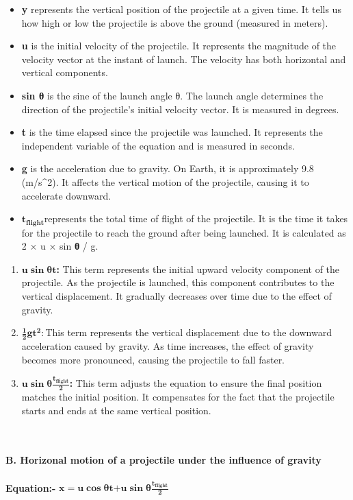 \documentclass{article}
\begin{document}
\begin{itemize}
\item
  \textbf{y} represents the vertical position of the projectile at a
  given time. It tells us how high or low the projectile is above the
  ground (measured in meters).
\item
  \textbf{u} is the initial velocity of the projectile. It represents
  the magnitude of the velocity vector at the instant of launch. The
  velocity has both horizontal and vertical components.
\item
  \textbf{sin θ} is the sine of the launch angle θ. The launch angle
  determines the direction of the projectile's initial velocity vector.
  It is measured in degrees.
\item
  \textbf{t} is the time elapsed since the projectile was launched. It
  represents the independent variable of the equation and is measured in
  seconds.
\item
  \textbf{g} is the acceleration due to gravity. On Earth, it is
  approximately 9.8 (m/s\^{}2). It affects the vertical motion of the
  projectile, causing it to accelerate downward.
\end{itemize}

\begin{itemize}
\item
  \(\mathbf{t}_{\mathbf{\text{flight}}}\)represents the total time of
  flight of the projectile. It is the time it takes for the projectile
  to reach the ground after being launched. It is calculated as 2 × u ×
  sin \textbf{θ} / g.
\end{itemize}
\begin{enumerate}
\def\labelenumi{\arabic{enumi}.}
\item
  \(\mathbf{u}\mathbf{\sin}\mathbf{\text{θt}}\)\textbf{:} This term
  represents the initial upward velocity component of the projectile. As
  the projectile is launched, this component contributes to the vertical
  displacement. It gradually decreases over time due to the effect of
  gravity.
\item
  \(\frac{\mathbf{1}}{\mathbf{2}}\mathbf{g}\mathbf{t}^{\mathbf{2}}\mathbf{:}\)This
  term represents the vertical displacement due to the downward
  acceleration caused by gravity. As time increases, the effect of
  gravity becomes more pronounced, causing the projectile to fall
  faster.
\item
  \(\mathbf{u}\mathbf{\sin}\mathbf{\theta}\frac{\mathbf{t}_{\mathbf{\text{flight}}}}{\mathbf{2}}\)\textbf{:}
  This term adjusts the equation to ensure the final position matches
  the initial position. It compensates for the fact that the projectile
  starts and ends at the same vertical position.
\end{enumerate}
\\
\\
\textbf{B. Horizonal motion of a projectile under the influence of gravity}
\\
\\
\textbf{Equation:-}
\(\mathbf{x = u}\mathbf{\cos}\mathbf{\text{θt}}\mathbf{+ u}\mathbf{\sin}\mathbf{\theta}\frac{\mathbf{t}_{\mathbf{\text{flight}}}}{\mathbf{2}}\)
\end{document}
